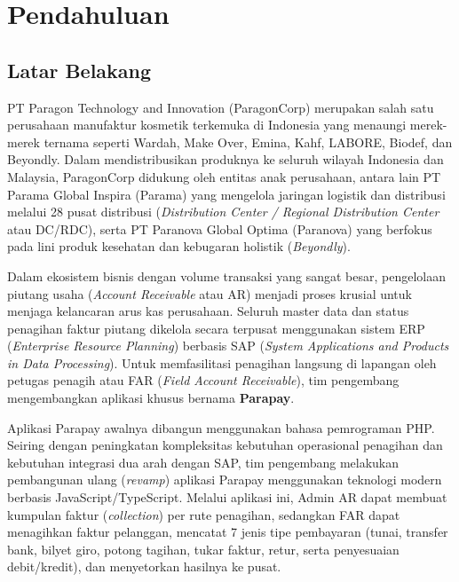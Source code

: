 \chapter{Pendahuluan}

\section{Latar Belakang}
PT Paragon Technology and Innovation (ParagonCorp) merupakan salah satu perusahaan manufaktur kosmetik terkemuka di Indonesia yang menaungi merek-merek ternama seperti Wardah, Make Over, Emina, Kahf, LABORE, Biodef, dan Beyondly. Dalam mendistribusikan produknya ke seluruh wilayah Indonesia dan Malaysia, ParagonCorp didukung oleh entitas anak perusahaan, antara lain PT Parama Global Inspira (Parama) yang mengelola jaringan logistik dan distribusi melalui 28 pusat distribusi (\textit{Distribution Center / Regional Distribution Center} atau DC/RDC), serta PT Paranova Global Optima (Paranova) yang berfokus pada lini produk kesehatan dan kebugaran holistik (\textit{Beyondly}).

Dalam ekosistem bisnis dengan volume transaksi yang sangat besar, pengelolaan piutang usaha (\textit{Account Receivable} atau AR) menjadi proses krusial untuk menjaga kelancaran arus kas perusahaan. Seluruh master data dan status penagihan faktur piutang dikelola secara terpusat menggunakan sistem ERP (\textit{Enterprise Resource Planning}) berbasis SAP (\textit{System Applications and Products in Data Processing}). Untuk memfasilitasi penagihan langsung di lapangan oleh petugas penagih atau FAR (\textit{Field Account Receivable}), tim pengembang mengembangkan aplikasi khusus bernama \textbf{Parapay}.

Aplikasi Parapay awalnya dibangun menggunakan bahasa pemrograman PHP. Seiring dengan peningkatan kompleksitas kebutuhan operasional penagihan dan kebutuhan integrasi dua arah dengan SAP, tim pengembang melakukan pembangunan ulang (\textit{revamp}) aplikasi Parapay menggunakan teknologi modern berbasis JavaScript/TypeScript. Melalui aplikasi ini, Admin AR dapat membuat kumpulan faktur (\textit{collection}) per rute penagihan, sedangkan FAR dapat menagihkan faktur pelanggan, mencatat 7 jenis tipe pembayaran (tunai, transfer bank, bilyet giro, potong tagihan, tukar faktur, retur, serta penyesuaian debit/kredit), dan menyetorkan hasilnya ke pusat.


